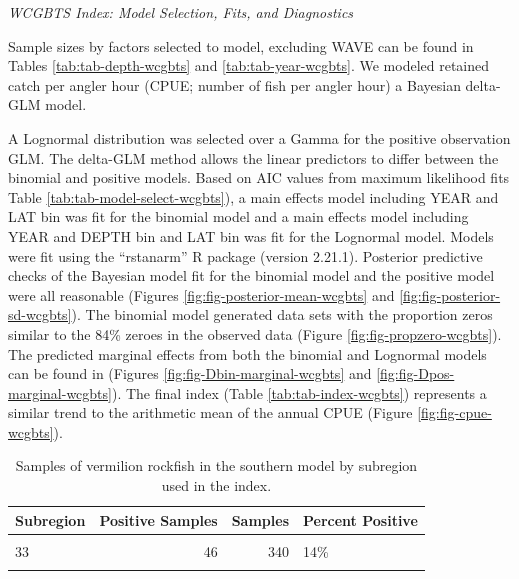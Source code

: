 \documentclass[11pt,
  english,
]{article}
\begin{document}
\emph{WCGBTS Index: Model Selection, Fits, and Diagnostics}

Sample sizes by factors selected to model, excluding WAVE can be found in Tables \ref{tab:tab-depth-wcgbts} and \ref{tab:tab-year-wcgbts}. We modeled retained catch per angler hour (CPUE; number of fish per angler hour) a Bayesian delta-GLM model.

A Lognormal distribution was selected over a Gamma for the positive observation GLM. The delta-GLM method allows the linear predictors to differ between the binomial and positive models. Based on AIC values from maximum likelihood fits Table \ref{tab:tab-model-select-wcgbts}), a main effects model including YEAR and LAT bin was fit for the binomial model and a main effects model including YEAR and DEPTH bin and LAT bin was fit for the Lognormal model. Models were fit using the ``rstanarm'' R package (version 2.21.1). Posterior predictive checks of the Bayesian model fit for the binomial model and the positive model were all reasonable (Figures \ref{fig:fig-posterior-mean-wcgbts} and \ref{fig:fig-posterior-sd-wcgbts}). The binomial model generated data sets with the proportion zeros similar to the 84\% zeroes in the observed data (Figure \ref{fig:fig-propzero-wcgbts}). The predicted marginal effects from both the binomial and Lognormal models can be found in (Figures \ref{fig:fig-Dbin-marginal-wcgbts} and \ref{fig:fig-Dpos-marginal-wcgbts}). The final index (Table \ref{tab:tab-index-wcgbts}) represents a similar trend to the arithmetic mean of the annual CPUE (Figure \ref{fig:fig-cpue-wcgbts}).

\newpage

\begin{table}

\caption{\label{tab:tab-region-wcgbts}Samples of vermilion rockfish in the southern model by subregion used in the index.}
\centering
\begin{tabular}[t]{lrrl}
\toprule
Subregion & Positive Samples & Samples & Percent Positive\\
\midrule
\cellcolor{gray!6}{32} & \cellcolor{gray!6}{14} & \cellcolor{gray!6}{64} & \cellcolor{gray!6}{22\%}\\
33 & 46 & 340 & 14\%\\
\cellcolor{gray!6}{34} & \cellcolor{gray!6}{58} & \cellcolor{gray!6}{339} & \cellcolor{gray!6}{17\%}\\
\bottomrule
\end{tabular}
\end{table}
\end{document}
